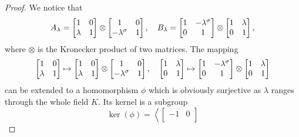 \begin{proof}
We notice that 
	\begin{equation*}
		A_{\lambda} = \begin{bmatrix}
			1 & 0 \\
			\lambda & 1 
		\end{bmatrix} \otimes
		\begin{bmatrix}
			1 & 0 \\
			-\lambda^{\sigma} & 1
		\end{bmatrix},\quad
		B_{\lambda} = \begin{bmatrix}
			1 & -\lambda^{\sigma} \\
			0 & 1
		\end{bmatrix} \otimes
		\begin{bmatrix}
			1 & \lambda \\
			0 & 1
		\end{bmatrix},
	\end{equation*}
	where $\otimes$ is the Kronecker product of two matrices. The mapping
	\begin{equation*}
		\begin{bmatrix}
			1 & 0 \\
			\lambda & 1 
		\end{bmatrix} \mapsto
		\begin{bmatrix}
			1 & 0 \\
			\lambda & 1
		\end{bmatrix} \otimes
		\begin{bmatrix}
			1 & 0 \\
			-\lambda^{\sigma} & 1
		\end{bmatrix},\quad 
		\begin{bmatrix}
			1 & \lambda \\
			0 & 1
		\end{bmatrix} \mapsto
		\begin{bmatrix}
			1 & -\lambda^{\sigma} \\
			0 & 1
		\end{bmatrix} \otimes
		\begin{bmatrix}
			1 & \lambda \\
			0 & 1
		\end{bmatrix}
	\end{equation*}
	can be extended to a homomorphism $\phi$ which is obviously surjective as $\lambda$
	 ranges
	through the whole field $K$. Its kernel is a subgroup
	\begin{equation*}
		\ker(\phi) = 
		\left\langle
			\begin{bmatrix}
				-1 & 0 \\

\end{bmatrix}
\end{equation*}
\end{proof}

